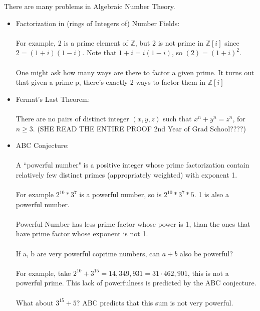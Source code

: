 \begin{example}
There are many problems in Algebraic Number Theory.
\begin{itemize}
    \item Factorization in (rings of Integers of) Number Fields:\\\\
    For example, 2 is a prime element of $\mathbb{Z}$, but 2 is not prime in $\mathbb{Z}[i]$ since $2 = (1 + i)(1 - i)$. Note that $1 + i = i(1 - i)$, so $(2) = (1 + i)^2$.\\\\
    One might ask how many ways are there to factor a given prime. It turns out that given a prime p, there's exactly 2 ways to factor them in $\mathbb{Z}[i]$
    \item Fermat's Last Theorem:\\\\
    There are no pairs of distinct integer $(x, y, z)$ such that $x^n + y^n = z^n$, for $n \geq 3$. (SHE READ THE ENTIRE PROOF 2nd Year of Grad School????)
    
    \item ABC Conjecture:\\\\
    A ``powerful number" is a positive integer whose prime factorization contain relatively few distinct primes (appropriately weighted) with exponent 1.\\\\
    For example $2^{10}*3^7$ is a powerful number, so is $2^{10}*3^7*5$. 1 is also a powerful number.\\\\
    Powerful Number has less prime factor whose power is 1, than the ones that have prime factor whose exponent is not 1.\\\\
    If a, b are very powerful coprime numbers, can $a+b$ also be powerful?\\\\
    For example, take $2^{10} + 3^{15} = 14,349,931 = 31 \cdot 462,901$, this is not a powerful prime. This lack of powerfulness is predicted by the ABC conjecture.\\\\
    What about $3^{15} + 5$? ABC predicts that this sum is not very powerful.
\end{itemize}
\end{example}

